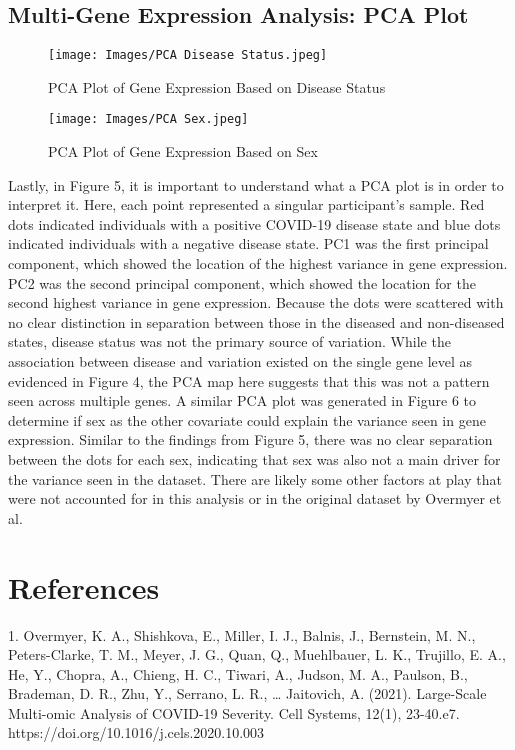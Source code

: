 \documentclass{article}
\begin{document}
\subsection{Multi-Gene Expression Analysis: PCA Plot}
\begin{figure}[hbt!]
    \centering
    \texttt{[image: Images/PCA Disease Status.jpeg]}
    \caption{PCA Plot of Gene Expression Based on Disease Status}
    \label{PCA Plot of Disease Status}
\end{figure}
\newpage
\begin{figure}[hbt!]
    \centering
    \texttt{[image: Images/PCA Sex.jpeg]}
    \caption{PCA Plot of Gene Expression Based on Sex}
    \label{PCA Plot of Sex}
\end{figure}
Lastly, in Figure 5, it is important to understand what a PCA plot is in order to interpret it. Here, each point represented a singular participant’s sample. Red dots indicated individuals with a positive COVID-19 disease state and blue dots indicated individuals with a negative disease state. PC1 was the first principal component, which showed the location of the highest variance in gene expression. PC2 was the second principal component, which showed the location for the second highest variance in gene expression. Because the dots were scattered with no clear distinction in separation between those in the diseased and non-diseased states, disease status was not the primary source of variation. While the association between disease and variation existed on the single gene level as evidenced in Figure 4, the PCA map here suggests that this was not a pattern seen across multiple genes. A similar PCA plot was generated in Figure 6 to determine if sex as the other covariate could explain the variance seen in gene expression. Similar to the findings from Figure 5, there was no clear separation between the dots for each sex, indicating that sex was also not a main driver for the variance seen in the dataset. There are likely some other factors at play that were not accounted for in this analysis or in the original dataset by Overmyer et al. 

\section{References}


\begin{hangparas}{2em}{1}
1. Overmyer, K. A., Shishkova, E., Miller, I. J., Balnis, J., Bernstein, M. N., Peters-Clarke, T. M., Meyer, J. G., Quan, Q., Muehlbauer, L. K., Trujillo, E. A., He, Y., Chopra, A., Chieng, H. C., Tiwari, A., Judson, M. A., Paulson, B., Brademan, D. R., Zhu, Y., Serrano, L. R., … Jaitovich, A. (2021). Large-Scale Multi-omic Analysis of COVID-19 Severity. Cell Systems, 12(1), 23-40.e7. https://doi.org/10.1016/j.cels.2020.10.003\\
\end{hangparas}
    
\end{document}
